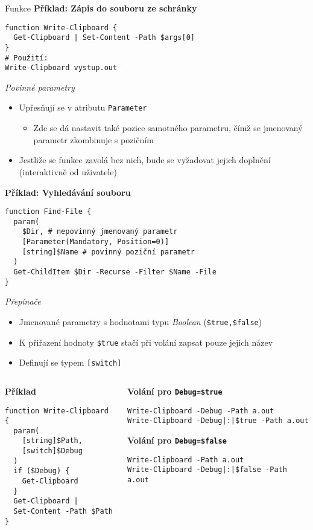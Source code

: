 \documentclass[main.tex]{subfiles}
\begin{document}
\begin{frame}{Funkce}
\textbf{Příklad: Zápis do souboru ze schránky}
  \begin{verbatim}
function Write-Clipboard {
  Get-Clipboard | Set-Content -Path $args[0]
}
# Použití:
Write-Clipboard vystup.out
  \end{verbatim}
\framebreak
\textit{Povinné parametry}
\begin{itemize}
  \item Upřesňují se v atributu \texttt{Parameter}
    \begin{itemize}
      \item Zde se dá nastavit také pozice samotného parametru, čímž se jmenovaný parametr zkombinuje s pozičním
    \end{itemize}
  \item Jestliže se funkce zavolá bez nich, bude se vyžadovat jejich doplnění (interaktivně od uživatele)
\end{itemize}
\textbf{Příklad: Vyhledávání souboru}
\begin{verbatim}
function Find-File {
  param(
    $Dir, # nepovinný jmenovaný parametr
    [Parameter(Mandatory, Position=0)]
    [string]$Name # povinný poziční parametr
  )
  Get-ChildItem $Dir -Recurse -Filter $Name -File
}
\end{verbatim}
\framebreak

\textit{Přepínače}
\begin{itemize}
  \item Jmenované parametry s hodnotami typu \textit{Boolean} (\texttt{\$true,\$false})
  \item K přiřazení hodnoty \texttt{\$true} stačí při volání zapsat pouze jejich název
  \item Definují se typem \texttt{[switch]}
\end{itemize}
\begin{columns}
  \begin{column}{0.38\textwidth}
 \textbf{Příklad}
  \begin{verbatim}
function Write-Clipboard {
  param(
    [string]$Path,
    [switch]$Debug
  )
  if ($Debug) {
    Get-Clipboard
  }
  Get-Clipboard |
  Set-Content -Path $Path
}
\end{verbatim}
  \end{column}
  \begin{column}{0.62\textwidth}
    \textbf{Volání pro \texttt{Debug=\$true}}
\begin{verbatim}
Write-Clipboard -Debug -Path a.out
Write-Clipboard -Debug|:|$true -Path a.out
  \end{verbatim}

\textbf{Volání pro \texttt{Debug=\$false}}
\begin{verbatim}
Write-Clipboard -Path a.out
Write-Clipboard -Debug|:|$false -Path a.out
  \end{verbatim}

  \end{column}
\end{columns}

\framebreak
\end{frame}
\end{document}

